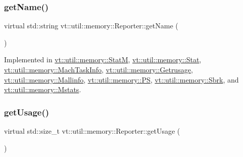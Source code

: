 \subsubsection{\texorpdfstring{get\+Name()}{getName()}}
{\footnotesize\ttfamily virtual std\+::string vt\+::util\+::memory\+::\+Reporter\+::get\+Name (\begin{DoxyParamCaption}{ }\end{DoxyParamCaption})\hspace{0.3cm}{\ttfamily [pure virtual]}}



Implemented in \hyperlink{structvt_1_1util_1_1memory_1_1_stat_m_ad8ea55e89ec3c591348a26b670048814}{vt\+::util\+::memory\+::\+StatM}, \hyperlink{structvt_1_1util_1_1memory_1_1_stat_a2a29912688c89bcb98d6132ecda6070f}{vt\+::util\+::memory\+::\+Stat}, \hyperlink{structvt_1_1util_1_1memory_1_1_mach_task_info_a4800048748574a7d57799c442aa2c390}{vt\+::util\+::memory\+::\+Mach\+Task\+Info}, \hyperlink{structvt_1_1util_1_1memory_1_1_getrusage_ae1261aca38feffabbbc8b8a510556d8b}{vt\+::util\+::memory\+::\+Getrusage}, \hyperlink{structvt_1_1util_1_1memory_1_1_mallinfo_a0e916973e080d93677e2e4f4cbf63580}{vt\+::util\+::memory\+::\+Mallinfo}, \hyperlink{structvt_1_1util_1_1memory_1_1_p_s_a011bb0261eefffa53110ba35243c4c8b}{vt\+::util\+::memory\+::\+PS}, \hyperlink{structvt_1_1util_1_1memory_1_1_sbrk_a21fc8bafbdf0a4bb92184474dae1d0f1}{vt\+::util\+::memory\+::\+Sbrk}, and \hyperlink{structvt_1_1util_1_1memory_1_1_mstats_a4718704523896839b8c7955d1098b647}{vt\+::util\+::memory\+::\+Mstats}.

\mbox{\label{structvt_1_1util_1_1memory_1_1_reporter_a372574f51fdb68077cd3d227ee373de5}} 
\subsubsection{\texorpdfstring{get\+Usage()}{getUsage()}}
{\footnotesize\ttfamily virtual std\+::size\+\_\+t vt\+::util\+::memory\+::\+Reporter\+::get\+Usage (\begin{DoxyParamCaption}{ }\end{DoxyParamCaption})\hspace{0.3cm}{\ttfamily [pure virtual]}}



